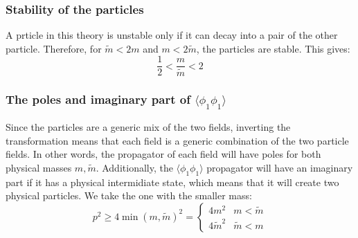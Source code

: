 \documentclass{article}
\begin{document}
\subsubsection{Stability of the particles}
A prticle in this theory is unstable only if it can decay into a pair of the other particle. Therefore, for $\tilde{m} < 2m$ and $m < 2\tilde{m}$, the particles are stable. This gives:
\begin{equation}
    \frac{1}{2} < \frac{m}{\tilde{m}} < 2
\end{equation}
\subsubsection{The poles and imaginary part of $\langle \phi_1\phi_1 \rangle$}
Since the particles are a generic mix of the two fields, inverting the transformation means that each field is a generic combination of the two particle fields. In other words, the propagator of each field will have poles for both physical masses $m, \tilde{m}$.
\newline
Additionally, the $\langle \phi_1\phi_1 \rangle$ propagator will have an imaginary part if it has a physical intermidiate state, which means that it will create two physical particles. We take the one with the smaller mass:
\begin{equation}
    p^2 \ge 4\min(m, \tilde{m})^2 = \begin{cases}
         4m^2 & m < \tilde{m} \\ 4\tilde{m}^2 & \tilde{m} < m
    \end{cases}
\end{equation}
\end{document}

